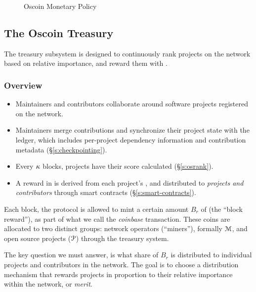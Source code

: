 \begin{figure*}[!ht]
    \par\medskip\noindent\minipage{\linewidth}
    \centering
    
    \caption{Oscoin Monetary Policy\label{f:oscoin}}
    \endminipage\par\medskip
\end{figure*}

\subsection{The Oscoin Treasury}
\label{s:treasury}

The treasury subsystem is designed to continuously rank projects on the
network based on relative importance, and reward them with \oscoin{}.

\subsubsection{Overview}

\begin{itemize}
    \item Maintainers and contributors collaborate around software projects
        registered on the network.
    \item Maintainers merge contributions and synchronize their project state
        with the ledger, which includes per-project dependency information and
        contribution metadata (\S\ref{s:checkpointing}).
    \item Every $\kappa$ blocks, projects have their \osrank{} score calculated
        (\S\ref{s:osrank}).
    \item A reward in \oscoin{} is derived from each project's \osrank{},
        and distributed to \emph{projects and contributors} through smart
        contracts (\S\ref{s:smart-contracts}).
\end{itemize}

\medskip

\noindent Each block, the protocol is allowed to mint a certain amount $B_r$ of \oscoin{}
(the ``block reward''), as part of what we call the \emph{coinbase}
transaction. These coins are allocated to two distinct groups: network
operators (``miners''), formally $\mathcal{M}$, and open source projects ($\mathcal{P}$)
through the treasury system.

The key question we must answer, is what share of $B_r$ is distributed to
individual projects and contributors in the network.  The goal is to choose
a distribution mechanism that rewards projects in proportion to their relative
importance within the network, or \emph{merit}.

